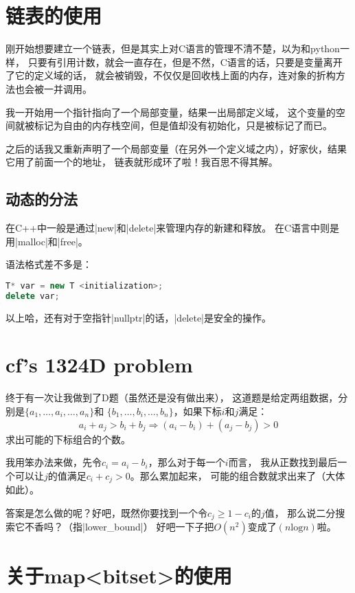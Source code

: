 \section{链表的使用}

刚开始想要建立一个链表，但是其实上对C语言的管理不清不楚，以为和python一样，
只要有引用计数，就会一直存在，但是不然，C语言的话，只要是变量离开了它的定义域的话，
就会被销毁，不仅仅是回收栈上面的内存，连对象的折构方法也会被一并调用。

我一开始用一个指针指向了一个局部变量，结果一出局部定义域，
这个变量的空间就被标记为自由的内存栈空间，但是值却没有初始化，只是被标记了而已。

之后的话我又重新声明了一个局部变量（在另外一个定义域之内），好家伙，结果它用了前面一个的地址，
链表就形成环了啦！我百思不得其解。

\subsection{动态的分法}
在C++中一般是通过\vb|new|和\vb|delete|来管理内存的新建和释放。
在C语言中则是用\vb|malloc|和\vb|free|。

语法格式差不多是：
\begin{lstlisting}[language=C++]
T* var = new T <initialization>;
delete var;
\end{lstlisting}

以上哈，还有对于空指针\vb|nullptr|的话，\vb|delete|是安全的操作。


\section{cf's 1324D problem}

终于有一次让我做到了D题（虽然还是没有做出来），
这道题是给定两组数据，分别是$\{a_1,\ldots,a_i,\ldots,a_n\}$和
$\{b_1,\ldots,b_i,\ldots,b_n\}$，如果下标$i$和$j$满足：
$$a_i+a_j>b_i+b_j\Rightarrow (a_i-b_i)+(a_j-b_j)>0$$
求出可能的下标组合的个数。

我用笨办法来做，先令$c_i=a_i-b_i$，那么对于每一个$i$而言，
我从正数找到最后一个可以让$j$的值满足$c_i+c_j>0$。那么累加起来，
可能的组合数就求出来了（大体如此）。

答案是怎么做的呢？好吧，既然你要找到一个令$c_j\ge 1-c_i$的$j$值，
那么说二分搜索它不香吗？（指\vb|lower\_bound|）
好吧一下子把$O(n^2)$变成了$(n\text{log}n)$啦。


\section{关于map<bitset>的使用}

